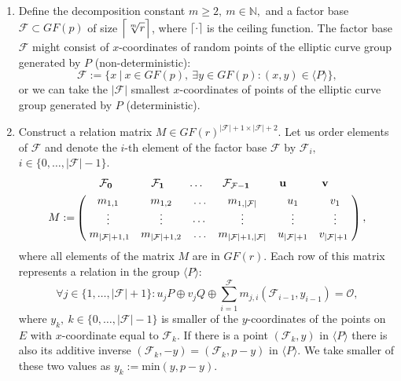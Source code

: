 \documentclass[thesis=M,english]{FITthesis}[2012/10/20]
\theoremstyle{remark}
\theoremstyle{definition}
\begin{document}
\begin{enumerate}
\item Define the decomposition constant $m \geq 2,\ m \in \mathbb{N},$ and a factor base $\mathcal{F} \subset GF(p)$ of size $\mathlarger{\Big\lceil \sqrt[m]{r} \Big\rceil}$, where $\lceil \cdot \rceil$ is the ceiling function. The factor base $\mathcal{F}$ might consist of $x$-coordinates of random points of the elliptic curve group generated by $P$ (non-deterministic):
$$
\mathcal{F} := \Big\{x\ \Big|\ x \in GF(p),\ \exists y \in GF(p): (x,y) \in \langle P \rangle  \Big\},
$$
or we can take the $|\mathcal{F}|$ smallest $x$-coordinates of points of the elliptic curve group generated by $P$ (deterministic).
\item Construct a relation matrix $M \in GF(r)^{|\mathcal{F}| + 1 \times |\mathcal{F}| + 2}$. Let us order elements of $\mathcal{F}$ and denote the $i$-th element of the factor base $\mathcal{F}$ by $\mathcal{F}_i,$ ${i \in \{0,\ldots,|\mathcal{F}| - 1\}}$.
\begin{align*}
&\begin{matrix}
\hphantom{........}\mathbf{\mathcal{F}_0} & \hphantom{.........} \mathbf{\mathcal{F}_1} & \hphantom{....}\ldots &\hphantom{...} \mathbf{\mathcal{F}_{\mathcal{F} - 1}} & \hphantom{......}\mathbf{u} & \hphantom{........} \mathbf{v}
\end{matrix}\\
M := &\begin{pmatrix}
m_{1,1} & m_{1,2} & \ldots & m_{1,|\mathcal{F}|} & u_1 & v_1 \\
\vdots & \vdots & \cdots & \vdots & \vdots  & \vdots  \\
\hphantom{.}m_{|\mathcal{F}| + 1,1} & m_{|\mathcal{F}| + 1,2} & \ldots & m_{|\mathcal{F}| + 1,|\mathcal{F}|} & u_{|\mathcal{F}| + 1} & v_{|\mathcal{F}| + 1} \hphantom{.}
\end{pmatrix},
\end{align*}
where all elements of the matrix $M$ are in $GF(r)$. Each row of this matrix represents a relation in the group $\langle P \rangle$:
$$
\forall j \in \{1,\ldots,|\mathcal{F}| + 1\}: u_jP \oplus v_jQ \oplus \sum_{i=1}^{\mathcal{F}} m_{j,i} (\mathcal{F}_{i-1}, y_{i-1}) = \mathcal{O}, 
$$
where $y_k,\ k \in \{0,\ldots,|\mathcal{F}| - 1\}$ is smaller of the $y$-coordinates of the points on $E$ with $x$-coordinate equal to $\mathcal{F}_k$. If there is a point $(\mathcal{F}_k, y)$ in $\langle P \rangle$ there is also its additive inverse $(\mathcal{F}_k,-y) = (\mathcal{F}_k, p - y)$ in $\langle P \rangle$. We take smaller of these two values as $y_k := \text{min}(y, p - y)$.  \\ \\

\end{enumerate}
\end{document}
